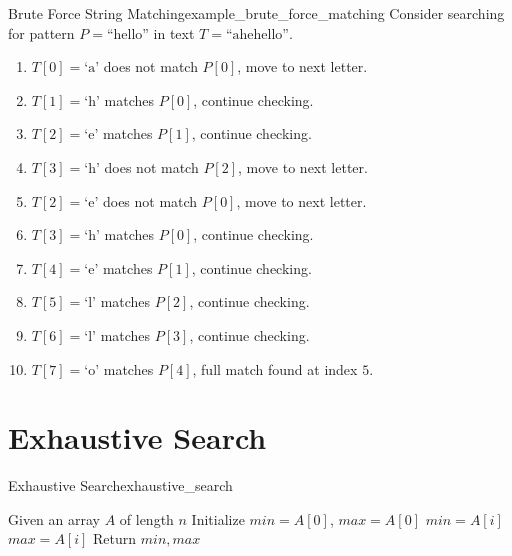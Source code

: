 \begin{exampletcb}
    {Brute Force String Matching}{example_brute_force_matching}
    Consider searching for pattern $P = \text{``hello''}$ in text $T = \text{``ahehello''}$.

    \begin{enumerate}
        \item $T[0] = \text{`a'}$ does not match $P[0]$, move to next letter.
        \item $T[1] = \text{`h'}$ matches $P[0]$, continue checking.
        \item $T[2] = \text{`e'}$ matches $P[1]$, continue checking.
        \item $T[3] = \text{`h'}$ does not match $P[2]$, move to next letter.
        \item $T[2] = \text{`e'}$ does not match $P[0]$, move to next letter.
        \item $T[3] = \text{`h'}$ matches $P[0]$, continue checking.
        \item $T[4] = \text{`e'}$ matches $P[1]$, continue checking.
        \item $T[5] = \text{`l'}$ matches $P[2]$, continue checking.
        \item $T[6] = \text{`l'}$ matches $P[3]$, continue checking.
        \item $T[7] = \text{`o'}$ matches $P[4]$, full match found at index $5$.
    \end{enumerate}
\end{exampletcb}


\section{Exhaustive Search}
\begin{algorithmtcb}
    {Exhaustive Search}{exhaustive_search}
    \begin{algorithmic}
        \State{} Given an array $A$ of length $n$
        \State{} Initialize $min = A[0]$, $max = A[0]$
                \State{} $min = A[i]$
            \EndIf{}
                \State{} $max = A[i]$
            \EndIf{}
        \EndFor{}
        \State{} Return $min, max$
    \end{algorithmic}
\end{algorithmtcb}

